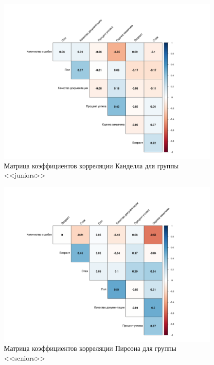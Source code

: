 \begin{figure}[H]
	\centering
	\includegraphics[width=\linewidth]{cor3}
	\caption{Матрица коэффициентов корреляции Канделла для группы <<juniors>>}
	\label{cor3}
\end{figure}



\begin{figure}[H]
	\centering
	\includegraphics[width=\linewidth]{cor4}
	\caption{Матрица коэффициентов корреляции Пирсона для группы <<seniors>>}
	\label{cor4}
\end{figure}

